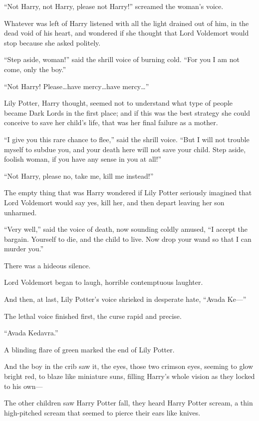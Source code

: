 \begin{em}
“Not Harry, not Harry, please not Harry!” screamed the woman’s voice.

Whatever was left of Harry listened with all the light drained out of him, in the dead void of his heart, and wondered if she thought that Lord Voldemort would stop because she asked politely.

“Step aside, woman!” said the shrill voice of burning cold. “For you I am not come, only the boy.”

“Not Harry! Please…have mercy…have mercy…”

Lily Potter, Harry thought, seemed not to understand what type of people became Dark Lords in the first place; and if this was the best strategy she could conceive to save her child’s life, that was her final failure as a mother.

“I give you this rare chance to flee,” said the shrill voice. “But I will not trouble myself to subdue you, and your death here will not save your child. Step aside, foolish woman, if you have any sense in you at all!”

“Not Harry, please no, take me, kill me instead!”

The empty thing that was Harry wondered if Lily Potter seriously imagined that Lord Voldemort would say yes, kill her, and then depart leaving her son unharmed.

“Very well,” said the voice of death, now sounding coldly amused, “I accept the bargain. Yourself to die, and the child to live. Now drop your wand so that I can murder you.”

There was a hideous silence.

Lord Voldemort began to laugh, horrible contemptuous laughter.

And then, at last, Lily Potter’s voice shrieked in desperate hate, “Avada Ke—”

The lethal voice finished first, the curse rapid and precise.

“Avada Kedavra.”

A blinding flare of green marked the end of Lily Potter.

And the boy in the crib saw it, the eyes, those two crimson eyes, seeming to glow bright red, to blaze like miniature suns, filling Harry’s whole vision as they locked to his own—
\end{em}

\later

The other children saw Harry Potter fall, they heard Harry Potter scream, a thin high-pitched scream that seemed to pierce their ears like knives.

